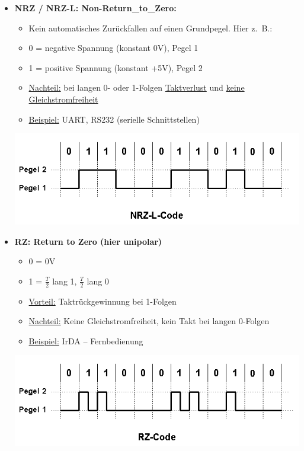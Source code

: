 \begin{itemize}
    \item \textbf{NRZ / NRZ-L: Non-Return\_to\_Zero:}
    \begin{itemize}
        \item Kein automatisches Zurückfallen auf einen Grundpegel.
        Hier z.\ B.:
        \item 0 = negative Spannung (konstant 0V), Pegel 1
        \item 1 = positive Spannung (konstant +5V), Pegel 2
        \item \underline{Nachteil:} bei langen 0- oder 1-Folgen \underline{Taktverlust} und \underline{keine Gleichstromfreiheit}
        \item \underline{Beispiel:} UART, RS232 (serielle Schnittstellen)
    \end{itemize}
    \includegraphics[width=\textwidth]{img/NRZ-L-Code}
    \item \textbf{RZ: Return to Zero (hier unipolar)}
    \begin{itemize}
        \item 0 = 0V
        \item 1 = $\frac{T}{2}$ lang 1, $\frac{T}{2}$ lang 0
        \item \underline{Vorteil:} Taktrückgewinnung bei 1-Folgen
        \item \underline{Nachteil:} Keine Gleichstromfreiheit, kein Takt bei langen 0-Folgen
        \item \underline{Beispiel:} IrDA – Fernbedienung
    \end{itemize}
    \includegraphics[width=\textwidth]{img/RZ-Code}
\end{itemize}

